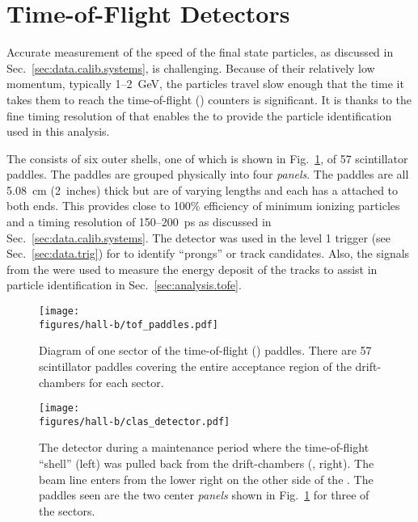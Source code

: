 \section{Time-of-Flight Detectors}\label{sec:clas.tof}

Accurate measurement of the speed of the final state particles, as discussed in Sec.~\ref{sec:data.calib.systems}, is challenging. Because of their relatively low momentum, typically 1--2~GeV, the particles travel slow enough that the time it takes them to reach the time-of-flight\cite{clas.tof} () counters is significant. It is thanks to the fine timing resolution of  that enables the  to provide the particle identification used in this analysis.

The  consists of six outer shells, one of which is shown in Fig.~\ref{fig:clas.tof.paddles}, of 57 scintillator paddles. The paddles are grouped physically into four \emph{panels}. The paddles are all 5.08~cm (2~inches) thick but are of varying lengths and each has a  attached to both ends. This provides close to 100\% efficiency of minimum ionizing particles and a timing resolution of 150--200~ps as discussed in Sec.~\ref{sec:data.calib.systems}. The  detector was used in the level 1 trigger (see Sec.~\ref{sec:data.trig}) for  to identify ``prongs'' or track candidates. Also, the  signals from the  were used to measure the energy deposit of the tracks to assist in particle identification in Sec.~\ref{sec:analysis.tofe}.

\begin{figure}\begin{center}
\texttt{[image: \\figures/hall-b/tof\_paddles.pdf]}
\caption[Time-of-Flight Paddles]{\label{fig:clas.tof.paddles}Diagram of one sector of the time-of-flight () paddles. There are 57 scintillator paddles covering the entire acceptance region of the drift-chambers for each sector.}
\end{center}\end{figure}

\begin{figure}\begin{center}
\texttt{[image: \\figures/hall-b/clas\_detector.pdf]}
\caption[ Detector (photograph)]{\label{fig:clas.photo}The  detector during a maintenance period where the time-of-flight ``shell'' (left) was pulled back from the drift-chambers (, right). The beam line enters from the lower right on the other side of the . The  paddles seen are the two center \emph{panels} shown in Fig.~\ref{fig:clas.tof.paddles} for three of the  sectors.}
\end{center}\end{figure}

